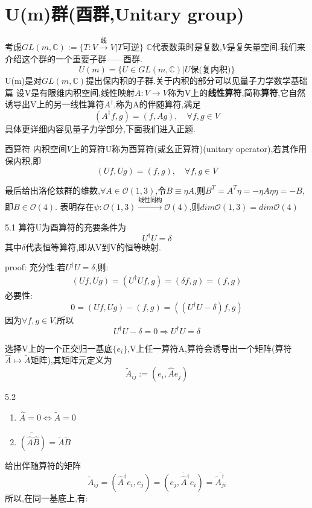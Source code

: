 \documentclass[../main.tex]{subfiles}
\begin{document}
 \section{U(m)群(酉群,Unitary group)}
 考虑$GL(m,\mathbb{C}):= \{T:V\xrightarrow{\text{线}}V|T\text{可逆}\}$ $\mathbb{C}$代表数乘时是复数,$V$是复矢量空间.我们来介绍这个群的一个重要子群——酉群.
 $$U(m) = \{U\in GL(m, \mathbb{C})|U\text{保(复内积)}\}$$
 U(m)是对$GL(m,\mathbb{C})$提出保内积的子群.关于内积的部分可以见量子力学数学基础篇%
 设V是有限维内积空间,线性映射$A:V\rightarrow V$称为V上的\textbf{线性算符},简称\textbf{算符},它自然诱导出V上的另一线性算符$A^\dagger$,称为A的伴随算符,满足
 $$(A^\dagger f,g) = (f,Ag),\quad \forall f,g \in V$$
 具体更详细内容见量子力学部分,下面我们进入正题.
 \begin{definition}{}{酉算符}
     内积空间$V$上的算符U称为酉算符(或幺正算符)(unitary operator),若其作用保内积,即
     $$(Uf,Ug)=(f,g), \quad \forall f,g \in V$$
 \end{definition}最后给出洛伦兹群的维数,$\forall A \in \mathscr{O}(1,3)$,令$B \equiv \eta A$,则$B^T = A^T \eta = -\eta A \eta \eta = -B$,即$B \in \mathscr{O}(4)$.
 表明存在$\psi:\mathscr{O}(1,3) \xrightarrow{\text{线性同构}}  \mathscr{O}(4)$,则$dim\mathscr{O}(1,3) = dim\mathscr{O}(4)$

 \begin{theorem}{}{5.1}
     算符U为酉算符的充要条件为$$U^\dagger U =\delta$$其中$\delta$代表恒等算符,即从V到V的恒等映射.
 \end{theorem}
 proof: 充分性:若$U^\dagger U = \delta$,则:
 \begin{align*}
     (Uf,Ug) = (U^\dagger Uf,g) = (\delta f,g) = (f,g)
 \end{align*}
 必要性:\begin{equation*}
    0 = (Uf,Ug) - (f,g) = ((U^\dagger U - \delta)f,g) 
 \end{equation*}
 因为$\forall f,g \in V$,所以
 $$U^\dagger U - \delta = 0 \Longrightarrow U^\dagger U = \delta$$

 选择V上的一个正交归一基底$\{e_i\}$,V上任一算符A,算符会诱导出一个矩阵(算符$\hat{A}\mapsto \tilde{A}$矩阵),其矩阵元定义为
 $$\tilde{A}_{ij} := (e_i,\hat{A}e_j)$$
 \begin{theorem}{}{5.2}
     \begin{enumerate}
         \item $\hat{A} = 0 \Longleftrightarrow \tilde{A} = 0$
         \item $\widetilde{(\hat{A}\hat{B})} =  \tilde{A}\tilde{B}$
     \end{enumerate}
 \end{theorem}
 给出伴随算符的矩阵
 $$\tilde{A}_{ij} = (\hat{A}^\dagger e_i,e_j) = \overline{(e_j,\hat{A}^\dagger e_i)} = \overline{\tilde{A}^\dagger _{ji}}$$
 所以,在同一基底上,有:
\end{document}
